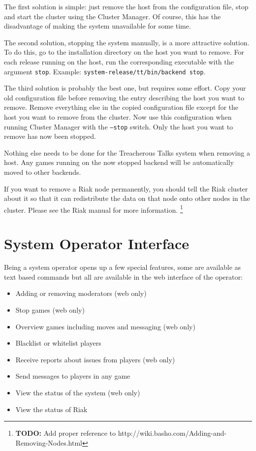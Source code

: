 \documentclass[11pt,a4paper]{report}
\newcommand{\todo}[1]{\footnote{{\color{red} {\bf TODO:} #1}}}
\begin{document}
The first solution is simple: just remove the host from the configuration file,
stop and start the cluster using the Cluster Manager. Of course, this has the
disadvantage of making the system unavailable for some time.

\begin{sloppypar}
The second solution, stopping the system manually, is a more attractive
solution. To do this, go to the installation directory on the host you want to
remove. For each release running on the host, run the corresponding executable
with the argument {\tt stop}. Example: {\tt system-release/tt/bin/backend
  stop}.
\end{sloppypar}

The third solution is probably the best one, but requires some effort. Copy your
old configuration file before removing the entry describing the host you want to
remove. Remove everything else in the copied configuration file except for the
host you want to remove from the cluster. Now use this configuration when
running Cluster Manager with the {\tt --stop} switch. Only the host you want to
remove has now been stopped.

Nothing else needs to be done for the Treacherous Talks system when removing a
host. Any games running on the now stopped backend will be automatically moved
to other backends.

If you want to remove a Riak node permanently, you should tell the Riak cluster
about it so that it can redistribute the data on that node onto other nodes in
the cluster. Please see the Riak manual for more information.
\todo{Add proper reference to http://wiki.basho.com/Adding-and-Removing-Nodes.html}
\section{System Operator Interface}
Being a system operator opens up a few special features, some are available as
text based commands but all are available in the web interface of the operator:
\begin{itemize}
\item Adding or removing moderators (web only)
\item Stop games (web only)
\item Overview games including moves and messaging (web only)
\item Blacklist or whitelist players
\item Receive reports about issues from players (web only)
\item Send messages to players in any game
\item View the status of the system (web only)
\item View the status of Riak
\end{itemize}
\end{document}
